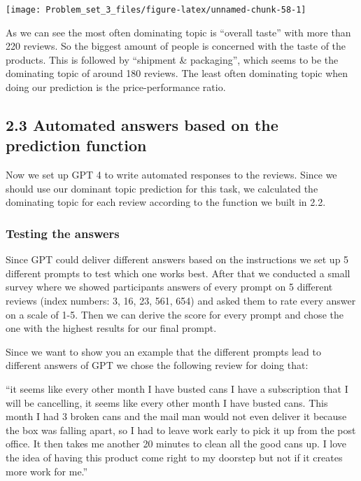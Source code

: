 \documentclass[
]{article}
\begin{document}
\begin{center}\texttt{[image: Problem\_set\_3\_files/figure-latex/unnamed-chunk-58-1]} \end{center}

As we can see the most often dominating topic is ``overall taste'' with
more than 220 reviews. So the biggest amount of people is concerned with
the taste of the products. This is followed by ``shipment \&
packaging'', which seems to be the dominating topic of around 180
reviews. The least often dominating topic when doing our prediction is
the price-performance ratio.

\hypertarget{automated-answers-based-on-the-prediction-function}{%
\subsection{2.3 Automated answers based on the prediction
function}\label{automated-answers-based-on-the-prediction-function}}

Now we set up GPT 4 to write automated responses to the reviews. Since
we should use our dominant topic prediction for this task, we calculated
the dominating topic for each review according to the function we built
in 2.2.

\hypertarget{testing-the-answers}{%
\subsubsection{Testing the answers}\label{testing-the-answers}}

Since GPT could deliver different answers based on the instructions we
set up 5 different prompts to test which one works best. After that we
conducted a small survey where we showed participants answers of every
prompt on 5 different reviews (index numbers: 3, 16, 23, 561, 654) and
asked them to rate every answer on a scale of 1-5. Then we can derive
the score for every prompt and chose the one with the highest results
for our final prompt.

Since we want to show you an example that the different prompts lead to
different answers of GPT we chose the following review for doing that:

``it seems like every other month I have busted cans I have a
subscription that I will be cancelling, it seems like every other month
I have busted cans. This month I had 3 broken cans and the mail man
would not even deliver it because the box was falling apart, so I had to
leave work early to pick it up from the post office. It then takes me
another 20 minutes to clean all the good cans up. I love the idea of
having this product come right to my doorstep but not if it creates more
work for me.''
\end{document}
